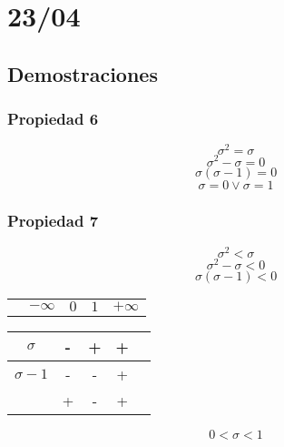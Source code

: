 \documentclass[12pt, letterpaper]{article}
\begin{document}
    \section{23/04}
        \subsection{Demostraciones}
            \subsubsection{Propiedad 6}
                \[\sigma^2=\sigma \]
                \[\sigma^2-\sigma=0 \]
                \[\sigma(\sigma-1)=0 \]
                \[\sigma=0 \vee \sigma=1 \]
            \subsubsection{Propiedad 7}
                \[\sigma^2<\sigma \]
                \[\sigma^2-\sigma<0 \]
                \[\sigma(\sigma-1)<0 \]
                \begin{center}
                    \begin{tabular}{ccccc}
                        \phantom{ppp}  & $-\infty$ & $0$ & $1$ & $+\infty$ \\
                    \end{tabular}

                    \begin{tabular}{|c|c|c|c|c|} 
                         \hline
                        $\sigma$ & - & + & + \\ 
                        \hline
                        $\sigma-1$ & - & - & + \\ 
                        \hline 
                         & + &- & + \\
                        \hline                        
                    \end{tabular}
                \end{center}
                \[0<\sigma<1 \]
\end{document}
